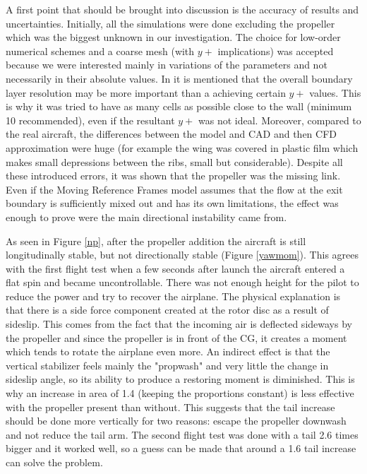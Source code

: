 \documentclass[11pt,a4paper,twoside,oneside]{article}
\begin{document}
A first point that should be brought into discussion is the accuracy of results and uncertainties. Initially, all the simulations were done excluding the propeller which was the biggest unknown in our investigation. The choice for low-order numerical schemes and a coarse mesh (with $y+$ implications) was accepted because we were interested mainly in variations of the parameters and not necessarily in their absolute values. In \cite{ansys} it is mentioned that the overall boundary layer resolution may be more important than a achieving certain $y+$ values. This is why it was tried to have as many cells as possible close to the wall (minimum 10 recommended), even if the resultant $y+$ was not ideal. Moreover, compared to the real aircraft, the differences between the model and CAD and then CFD approximation were huge (for example the wing was covered in plastic film which makes small depressions between the ribs, small but considerable). Despite all these introduced errors, it was shown that the propeller was the missing link. Even if the Moving Reference Frames model assumes that the flow at the exit boundary is sufficiently mixed out and has its own limitations, the effect was enough to prove were the main directional instability came from.

As seen in Figure \ref{np}, after the propeller addition the aircraft is still longitudinally stable, but not directionally stable (Figure \ref{yawmom}). This agrees with the first flight test when a few seconds after launch the aircraft entered a flat spin and became uncontrollable. There was not enough height for the pilot to reduce the power and try to recover the airplane. The physical explanation is that there is a side force component created at the rotor disc as a result of sideslip. This comes from the fact that the incoming air is deflected sideways by the propeller and since the propeller is in front of the CG, it creates a moment which tends to rotate the airplane even more. An indirect effect is that the vertical stabilizer feels mainly the "propwash" and very little the change in sideslip angle, so its ability to produce a restoring moment is diminished. This is why an increase in area of 1.4 (keeping the proportions constant) is less effective with the propeller present than without. This suggests that the tail increase should be done more vertically for two reasons: escape the propeller downwash and not reduce the tail arm. The second flight test was done with a tail 2.6 times bigger and it worked well, so a guess can be made that around a 1.6 tail increase can solve the problem.
\end{document}
